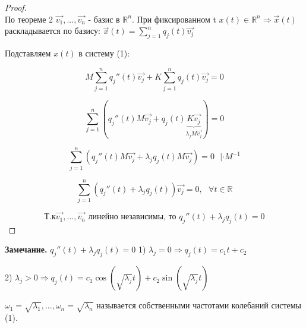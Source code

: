 \documentclass[12pt, a4paper]{report}
\begin{document}
\begin{proof}
    \[  \] 
    По теореме 2 \( \vec{v_1},..., \vec{v_n }   \)  - базис в \( \mathbb{R} ^ n \). При фиксированном t \( x(t ) \in  \mathbb{R}^{n} \Rightarrow \vec{x } (t)  \)  раскладывается по базису: \( \vec{x } (t) = \sum_{j=1} ^{n } q_j (t)\vec{v_j}  \) 

    Подставляем \( x(t) \)  в систему (1): 

    \[ M \sum_{j =1}^n q_j '' (t ) \vec{v_j} + K \sum_{j =1}^n q_j (t ) \vec{v_j} = 0  \] 

    \[ \sum_{j=1}^ n \left( q_j '' (t ) M \vec{v_j } + q_j (t )\underbrace{ K \vec{v_j } }_{\lambda_j M \vec{v_j } } \right) =0\] 

    \[ \sum _{j=1}^ n \left( q_j '' (t ) M \vec{v_j } + \lambda_j q_j (t )M\vec{v_j }  \right) = 0 \text{ }  | \cdot  M^{-1}  \] 

    \[ \sum _{j=1}^ n \left( q_j '' (t  ) + \lambda_j q_j (t ) \right) \vec{v_j }= 0 , \text{ }  \forall  t \in  \mathbb{R}   \] 

    \[ \text{Т.к} \vec{v_1 },..., \vec{v_n} \text{ линейно независимы, то }  q_j '' (t ) + \lambda_j q_j (t) =0    \] 


\end{proof}

\begin{center}
    \textbf{Замечание.} \( q_j ''(t ) + \lambda_j q_j (t) = 0 \) 
    1) \( \lambda_j = 0 \Rightarrow q_j (t ) = c_1 t + c_2  \) 

    2) \( \lambda_j > 0 \Rightarrow q_j (t )  = c_1 \cos (\sqrt{\lambda_j} t) + c_2 \sin (\sqrt{\lambda_j} t) \)
\end{center}

\begin{definition}
    \( \omega_1 = \sqrt{\lambda_1},..., \omega_n = \sqrt{\lambda_n} \) называется собственными частотами колебаний системы (1).
\end{definition}


\ifdefined\mainfile
\else
    
\end{document}
